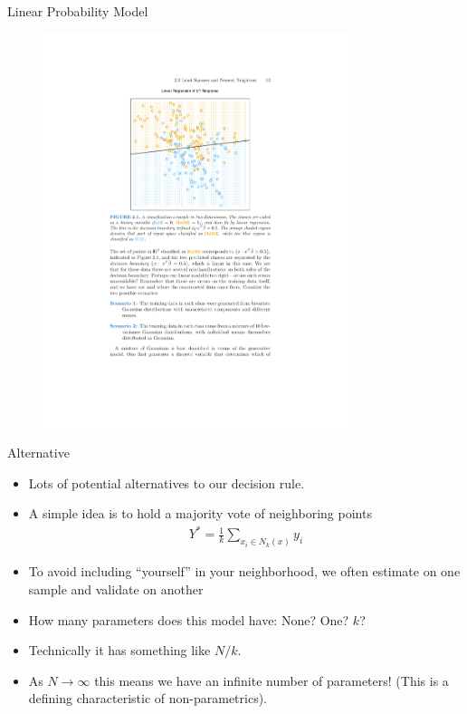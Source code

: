 \documentclass[11pt,handout,xcolor=pdftex,dvipsnames,table,mathserif,aspectratio=169]{beamer}
\begin{document}
\begin{frame}{Linear Probability Model}
\begin{figure}[htbp]
\begin{center}
\includegraphics[width=3.5in]{./resources/classifierOLS.pdf}
\label{classOLS}
\end{center}
\end{figure}
\end{frame}


\begin{frame}{Alternative}
\begin{itemize}
\item Lots of potential alternatives to our decision rule.
\item A simple idea is to hold a majority vote of neighboring points 
\begin{eqnarray*}
Y^{*} = \frac{1}{k} \sum_{x_i \in N_k(x)} y_i
\end{eqnarray*}
\item To avoid including ``yourself'' in your neighborhood, we often estimate on one sample and validate on another
\item How many parameters does this model have: None? One? $k$? 
\item Technically it has something like $N/k$.
\item As $N \rightarrow \infty$ this means we have an infinite number of parameters! (This is a defining characteristic of non-parametrics).
\end{itemize}
\end{frame}
\end{document}
